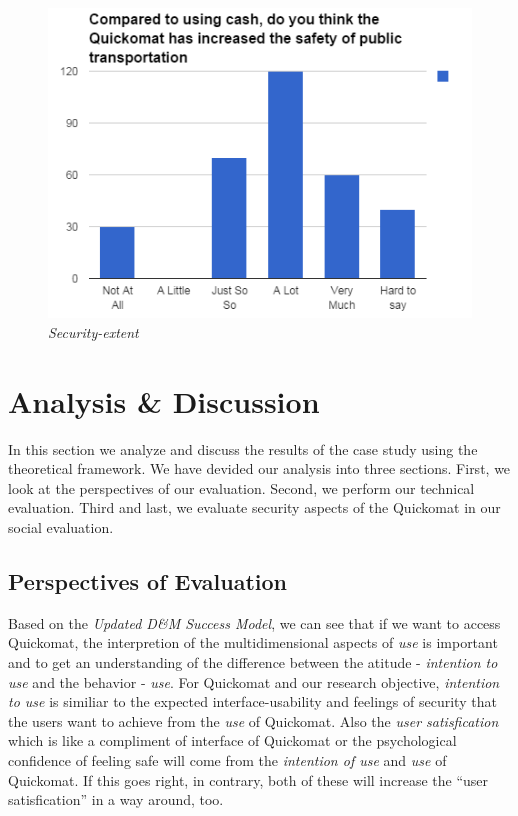 \documentclass[twocolumn]{article}
\begin{document}
\begin{figure}
  \centering
  \includegraphics[width=\columnwidth]{fig/security-extent.png}
  \caption{\emph{Security-extent}}
  \label{fig:security-extent}
\end{figure}



\section{Analysis \& Discussion}
In this section we analyze and discuss the results of the case study using the theoretical framework. We have devided our analysis into three sections. First, we look at the perspectives of our evaluation. Second, we perform our technical evaluation. Third and last, we evaluate security aspects of the Quickomat in our social evaluation.

\subsection{Perspectives of Evaluation}
Based on the \emph{Updated D\&M Success Model}, we can see that if we want to access Quickomat, the interpretion of the multidimensional aspects of \emph{use} is important and to get an understanding of the difference between the atitude - \emph{intention to use} and the behavior - \emph{use}. For Quickomat and our research objective, \emph{intention to use} is similiar to the expected interface-usability and feelings of security that the users want to achieve from the \emph{use} of Quickomat. Also the \emph{user satisfication} which is like a compliment of interface of Quickomat or the psychological confidence of feeling safe will come from the \emph{intention of use} and \emph{use} of Quickomat. If this goes right, in contrary, both of these will increase the “user satisfication” in a way around, too.  
\end{document}
